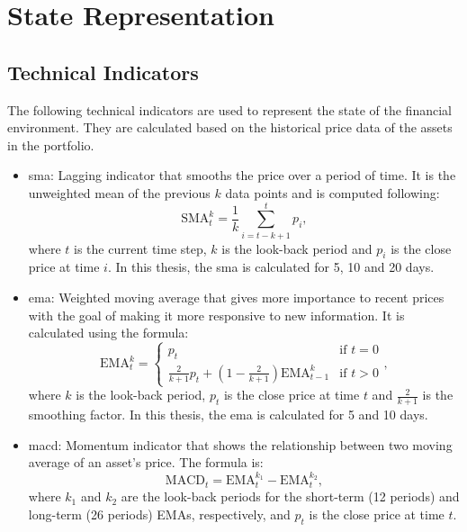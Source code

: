 \chapter{State Representation} \label{app:state_representation}

\section{Technical Indicators} \label{sec:technical-indicators}

The following technical indicators are used to represent the state of the financial environment. They are calculated based on the historical price data of the assets in the portfolio.

\begin{itemize}
    \item \acrfull{sma}: Lagging indicator that smooths the price over a period of time. It is the unweighted mean of the previous $k$ data points and is computed following:
    \begin{equation}
        \text{SMA}_t^k = \frac{1}{k} \sum_{i=t-k+1}^{t} p_{i},
    \end{equation}
    where $t$ is the current time step, $k$ is the look-back period and $p_i$ is the close price at time $i$.
    In this thesis, the \acrshort{sma} is calculated for 5, 10 and 20 days. 
    \item \acrfull{ema}: Weighted moving average that gives more importance to recent prices with the goal of making it more responsive to new information. It is calculated using the formula:
    \begin{equation}
        \text{EMA}_t^k = \begin{cases} p_t & \text{if } t = 0 \\ \frac{2}{k+1} p_t + \left(1 - \frac{2}{k+1}\right) \text{EMA}_{t-1}^{k} & \text{if } t > 0 \end{cases},
    \end{equation}
    where $k$ is the look-back period, $p_t$ is the close price at time $t$ and $\frac{2}{k+1}$ is the smoothing factor. In this thesis, the \acrshort{ema} is calculated for 5 and 10 days.
    \item \acrfull{macd}: Momentum indicator that shows the relationship between two moving average of an asset's price. The formula is:
    \begin{equation}
        \text{MACD}_t = \text{EMA}_t^{k_1} - \text{EMA}_t^{k_2},
    \end{equation}
    where $k_1$ and $k_2$ are the look-back periods for the short-term (12 periods) and long-term (26 periods) EMAs, respectively, and $p_t$ is the close price at time $t$.

\end{itemize}
